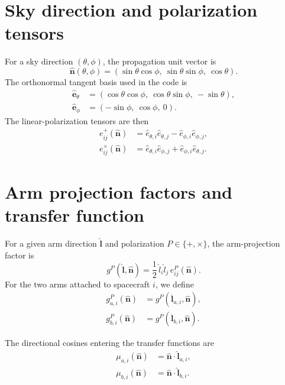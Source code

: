 \documentclass[11pt]{article}
\begin{document}
\section{Sky direction and polarization tensors}

For a sky direction $(\theta,\phi)$, the propagation unit vector is
\begin{equation}
\hat{\bm n}(\theta,\phi)
=
(\sin\theta\cos\phi,\ \sin\theta\sin\phi,\ \cos\theta).
\end{equation}
The orthonormal tangent basis used in the code is
\begin{align}
\hat{\bm e}_\theta
&=
(\cos\theta\cos\phi,\ \cos\theta\sin\phi,\ -\sin\theta), \\
\hat{\bm e}_\phi
&=
(-\sin\phi,\ \cos\phi,\ 0).
\end{align}
The linear-polarization tensors are then
\begin{align}
e^+_{ij}(\hat{\bm n})
&=
\hat e_{\theta,i}\hat e_{\theta,j}
-
\hat e_{\phi,i}\hat e_{\phi,j}, \\
e^\times_{ij}(\hat{\bm n})
&=
\hat e_{\theta,i}\hat e_{\phi,j}
+
\hat e_{\phi,i}\hat e_{\theta,j}.
\end{align}

\section{Arm projection factors and transfer function}

For a given arm direction $\hat{\bm l}$ and polarization $P\in\{+,\times\}$, the arm-projection factor is
\begin{equation}
g^P(\hat{\bm l},\hat{\bm n})
=
\frac{1}{2}\,\hat l_i \hat l_j\, e^P_{ij}(\hat{\bm n}).
\end{equation}
For the two arms attached to spacecraft $i$, we define
\begin{align}
g^P_{a,i}(\hat{\bm n}) &= g^P(\hat{\bm l}_{a,i},\hat{\bm n}), \\
g^P_{b,i}(\hat{\bm n}) &= g^P(\hat{\bm l}_{b,i},\hat{\bm n}).
\end{align}

The directional cosines entering the transfer functions are
\begin{align}
\mu_{a,i}(\hat{\bm n}) &= \hat{\bm n}\cdot \hat{\bm l}_{a,i}, \\
\mu_{b,i}(\hat{\bm n}) &= \hat{\bm n}\cdot \hat{\bm l}_{b,i}.
\end{align}
\end{document}
